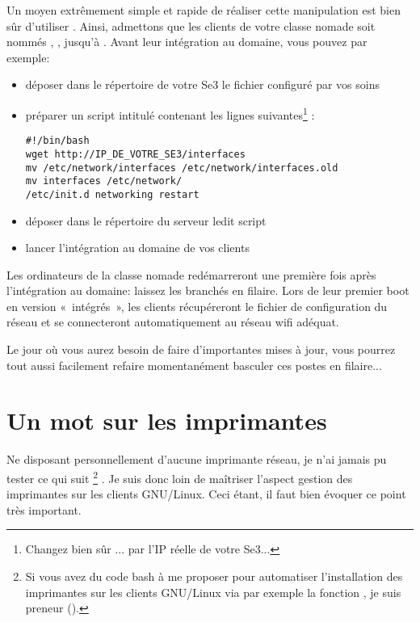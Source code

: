 Un moyen extrêmement simple et rapide de réaliser cette manipulation est bien
sûr d'utiliser . Ainsi, admettons que les clients de votre
classe nomade soit nommés , , jusqu'à
. Avant leur intégration au domaine, vous pouvez par
exemple:
\begin{itemize}
 \item déposer dans le répertoire  de votre Se3 le fichier
 configuré par vos soins
 \item préparer un script intitulé  contenant
les lignes suivantes\footnote{Changez bien sûr ...
par l'IP réelle de votre Se3...} :

\begin{lstlisting}
#!/bin/bash
wget http://IP_DE_VOTRE_SE3/interfaces
mv /etc/network/interfaces /etc/network/interfaces.old
mv interfaces /etc/network/
/etc/init.d networking restart
\end{lstlisting}

 \item déposer dans le répertoire
 du serveur ledit
script
 \item lancer l'intégration au domaine de vos clients
\end{itemize}

Les ordinateurs de la classe nomade redémarreront une première fois après
l'intégration au domaine: laissez les branchés en filaire. Lors de leur premier
boot en version «~intégrés~», les clients récupéreront le fichier de
configuration du réseau et se connecteront automatiquement au réseau wifi
adéquat.

Le jour où vous aurez besoin de faire d'importantes mises à jour, vous pourrez
tout aussi facilement refaire momentanément basculer ces postes en filaire...


\section{Un mot sur les imprimantes}
\label{imprimante}

Ne disposant personnellement d'aucune imprimante réseau, je n'ai jamais pu tester
ce qui suit%
\footnote{Si vous avez du code bash à me proposer pour automatiser
l'installation des imprimantes sur les clients GNU/Linux via par exemple la fonction
, je suis preneur
().}%
%
.
Je suis donc loin de maîtriser l'aspect \og gestion des imprimantes \fg{} sur les
clients GNU/Linux. Ceci étant, il faut bien évoquer ce point très important.

